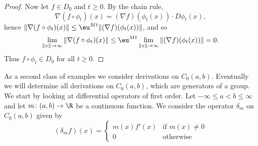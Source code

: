 \begin{proof}
Now let $f \in D_{0}$ and $t \geq 0$. By the chain rule,
\[
    \nabla(f \circ \phi_{t})(x) = (\nabla f)(\phi_{t}(x)) \cdot D\phi_{t}(x),
\]
hence $\|\nabla(f \circ \phi_{t})(x)\| \leq \eu^{Mt}\|(\nabla f)(\phi_{t}(x))\|$, and so
\[
    \lim_{\|x\| \to \infty} \|\nabla(f \circ \phi_{t})(x)\|
    \leq \eu^{Mt} \lim_{\|x\| \to \infty} \|(\nabla f)(\phi_{t}(x))\| = 0.
\]
Thus $f \circ \phi_{t} \in D_{0}$ for all $t \geq 0$.
\end{proof}
As a second class of examples we consider derivations on $C_{0}(a,b)$.
Eventually we will determine all derivations on $C_{0}(a,b)$, which are generators of a group.
We start by looking at differential operators of first order.
Let $-\infty \leq a < b \leq \infty$ and let $m \colon (a,b) \to \R$ be a continuous function.
We consider the operator $\delta_{m}$ on $C_{0}(a,b)$ given by
\begin{equation*}\label{eq:b2-delta-m}
(\delta_{m}f)(x) = \begin{cases}
    m(x)f'(x) & \text{if } m(x) \neq 0 \\
    0 & \text{otherwise}
\end{cases}
\end{equation*}
